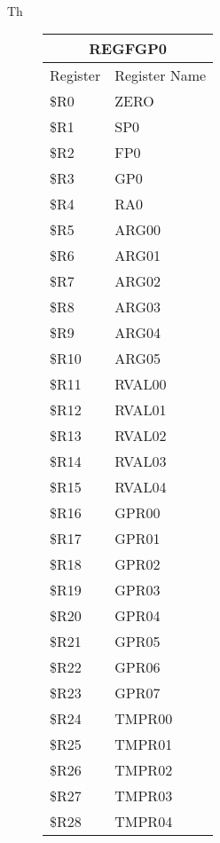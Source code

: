 \documentclass[letterpaper, 11pt]{article}
\begin{document}
\paragraph{}Th
	\begin{figure}[!h]
		\parbox{0.2\linewidth}{
			\centering
			\fontsize{6}{8}\selectfont
			\begin{tabular}{|l|l|}
				\hline
				\multicolumn{2}{|c|}{REGFGP0} \\
				\hline
				Register & Register Name \\ \hline
				\$R0  & ZERO \\ 	\hline
				\$R1  & SP0 \\ 	\hline
				\$R2  & FP0 \\ 	\hline
				\$R3  & GP0 \\ 	\hline
				\$R4  & RA0 \\ 	\hline
				\$R5  & ARG00 \\ 	\hline
				\$R6  & ARG01 \\ 	\hline
				\$R7  & ARG02 \\ 	\hline
				\$R8  & ARG03 \\ 	\hline
				\$R9  & ARG04 \\ 	\hline
				\$R10 & ARG05 \\ \hline
				\$R11 & RVAL00  \\ \hline
				\$R12 & RVAL01  \\ \hline
				\$R13 & RVAL02  \\ \hline
				\$R14 & RVAL03  \\ \hline
				\$R15 & RVAL04  \\ \hline
				\$R16 & GPR00  \\ \hline
				\$R17 & GPR01  \\ \hline
				\$R18 & GPR02  \\ \hline
				\$R19 & GPR03  \\ \hline
				\$R20 & GPR04  \\ \hline
				\$R21 & GPR05  \\ \hline
				\$R22 & GPR06  \\ \hline
				\$R23 & GPR07  \\ \hline
				\$R24 & TMPR00  \\ \hline
				\$R25 & TMPR01  \\ \hline
				\$R26 & TMPR02  \\ \hline
				\$R27 & TMPR03  \\ \hline
				\$R28 & TMPR04  \\ \hline

\end{tabular}}
\end{figure}
\end{document}
